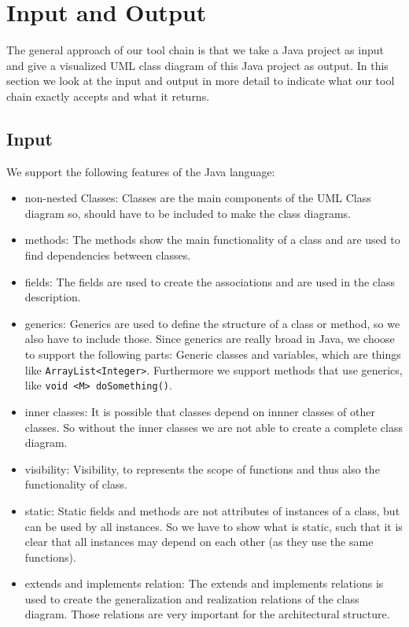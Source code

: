 \documentclass[a4paper,11pt]{article}
\begin{document}
	\section{Input and Output}
		The general approach of our tool chain is that we take a Java project as input and give a visualized UML class diagram of this Java project as output. In this section we look at the input and output in more detail to indicate what our tool chain exactly accepts and what it returns.
		
		\subsection{Input}
			We support the following features of the Java language:
			\begin{itemize}
				\item non-nested Classes: Classes are the main components of the UML Class diagram so, should have to be included to make the class diagrams.
				\item methods: The methods show the main functionality of a class and are used to find dependencies between classes.
				\item fields: The fields are used to create the associations and are used in the class description.
				\item generics: Generics are used to define the structure of a class or method, so we also have to include those. Since generics are really broad in Java, we choose to support the following parts: Generic classes and variables, which are things like \texttt{ArrayList<Integer>}. Furthermore we support methods that use generics, like \texttt{void <M> doSomething()}.
				\item inner classes: It is possible that classes depend on innner classes of other classes. So without the inner classes we are not able to create a complete class diagram.
				\item visibility: Visibility, to represents the scope of functions and thus also the functionality of class.
				\item static: Static fields and methods are not attributes of instances of a class, but can be used by all instances. So we have to show what is static, such that it is clear that all instances may depend on each other (as they use the same functions).
				\item extends and implements relation: The extends and implements relations is used to create the generalization and realization relations of the class diagram. Those relations are very important for the architectural structure.
			\end{itemize}
		
\end{document}
